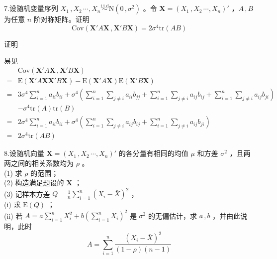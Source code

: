 \documentclass[12pt,hyperref,]{ctexart}
\begin{document}
\vspace{3em}

\kaishu

7.设随机变量序列
\(X_1\, ,X_2\, \cdots ,X_n\overset{\mathrm{i.i.d}}{\sim}\mathrm{N}(0\, ,\sigma^2)\)
。令 \(\mathbf{X}=(X_1\, ,X_2\, \cdots ,X_n)'\) ，\(A\, ,B\) 为任意
\(n\) 阶对称矩阵。证明 \begin{equation*}
\mathrm{Cov}(\mathbf{X}'A\mathbf{X}\, ,\mathbf{X}'B\mathbf{X})=2\sigma^4\mathrm{tr}(AB)
\end{equation*}

\vspace{1em}

\heiti

证明

\songti

易见 \begin{equation*}
\begin{aligned}
&\mathrm{Cov}(\mathbf{X}'A\mathbf{X}\, ,\mathbf{X}'B\mathbf{X}) \\
=&\mathrm{E}(\mathbf{X}'A\mathbf{X}\mathbf{X}'B\mathbf{X})-\mathrm{E}(\mathbf{X}'A\mathbf{X})\mathrm{E}(\mathbf{X}'B\mathbf{X}) \\
=&3\sigma^4\sum_{i=1}^{n}a_{ii}b_{ii}+\sigma^4\left(\sum_{i=1}^{n}\sum_{j\ne i}a_{ii}b_{jj}+\sum_{i=1}^{n}\sum_{j\ne i}a_{ij}b_{ij}+\sum_{i=1}^{n}\sum_{j\ne i}a_{ij}b_{ji}\right)\\
&-\sigma^4\mathrm{tr}(A)\mathrm{tr}(B) \\
=&2\sigma^4\sum_{i=1}^{n}a_{ii}b_{ii}+\sigma^4\left(\sum_{i=1}^{n}\sum_{j\ne i}a_{ij}b_{ij}+\sum_{i=1}^{n}\sum_{j\ne i}a_{ij}b_{ji}\right)\\
=&2\sigma^4\mathrm{tr}(AB)
\end{aligned}
\end{equation*}

\vspace{3em}

\kaishu

8.设随机向量 \(\mathbf{X}=(X_1\, ,X_2\, \cdots ,X_n)'\)
的各分量有相同的均值 \(\mu\) 和方差 \(\sigma^2\)
，且两两之间的相关系数均为 \(\rho\) 。\\
(1) 求 \(\rho\) 的范围；\\
(2) 构造满足题设的 \(\mathbf{X}\) ；\\
(3) 记样本方差 \(Q=\frac 1n \sum_{i=1}^{n}(X_i-\bar{X})^2\) ，\\
(i) 求 \(\mathrm{E}(Q)\) ；\\
(ii) 若 \(A=a\sum_{i=1}^nX_i^2+b(\sum_{i=1}^nX_i)^2\) 是 \(\sigma^2\)
的无偏估计，求 \(a\, ,b\) ，并由此说明，此时 \begin{equation*}
A=\sum_{i=1}^n\frac{(X_i-\bar{X})^2}{(1-\rho)(n-1)}
\end{equation*}
\end{document}
